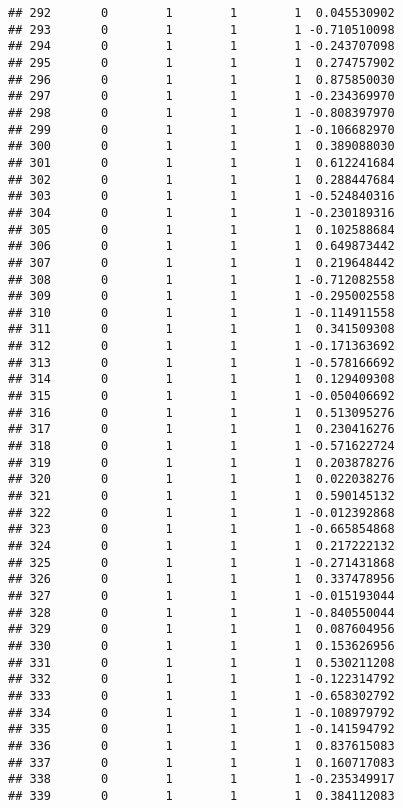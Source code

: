 \documentclass[]{book}
\theoremstyle{definition}
\theoremstyle{definition}
\theoremstyle{definition}
\theoremstyle{remark}
\begin{document}
\begin{verbatim}
## 292       0        1        1        1  0.045530902
## 293       0        1        1        1 -0.710510098
## 294       0        1        1        1 -0.243707098
## 295       0        1        1        1  0.274757902
## 296       0        1        1        1  0.875850030
## 297       0        1        1        1 -0.234369970
## 298       0        1        1        1 -0.808397970
## 299       0        1        1        1 -0.106682970
## 300       0        1        1        1  0.389088030
## 301       0        1        1        1  0.612241684
## 302       0        1        1        1  0.288447684
## 303       0        1        1        1 -0.524840316
## 304       0        1        1        1 -0.230189316
## 305       0        1        1        1  0.102588684
## 306       0        1        1        1  0.649873442
## 307       0        1        1        1  0.219648442
## 308       0        1        1        1 -0.712082558
## 309       0        1        1        1 -0.295002558
## 310       0        1        1        1 -0.114911558
## 311       0        1        1        1  0.341509308
## 312       0        1        1        1 -0.171363692
## 313       0        1        1        1 -0.578166692
## 314       0        1        1        1  0.129409308
## 315       0        1        1        1 -0.050406692
## 316       0        1        1        1  0.513095276
## 317       0        1        1        1  0.230416276
## 318       0        1        1        1 -0.571622724
## 319       0        1        1        1  0.203878276
## 320       0        1        1        1  0.022038276
## 321       0        1        1        1  0.590145132
## 322       0        1        1        1 -0.012392868
## 323       0        1        1        1 -0.665854868
## 324       0        1        1        1  0.217222132
## 325       0        1        1        1 -0.271431868
## 326       0        1        1        1  0.337478956
## 327       0        1        1        1 -0.015193044
## 328       0        1        1        1 -0.840550044
## 329       0        1        1        1  0.087604956
## 330       0        1        1        1  0.153626956
## 331       0        1        1        1  0.530211208
## 332       0        1        1        1 -0.122314792
## 333       0        1        1        1 -0.658302792
## 334       0        1        1        1 -0.108979792
## 335       0        1        1        1 -0.141594792
## 336       0        1        1        1  0.837615083
## 337       0        1        1        1  0.160717083
## 338       0        1        1        1 -0.235349917
## 339       0        1        1        1  0.384112083

\end{verbatim}
\end{document}
